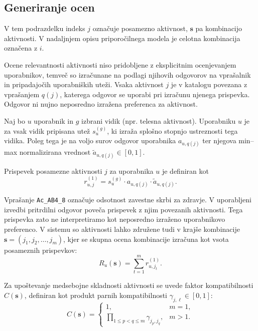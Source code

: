 \documentclass[a4paper,twoside,openright,12pt,slovene]{book}
\begin{document}
\subsection{Generiranje ocen}
\label{sec:data_rating_gen}

V tem podrazdelku indeks $j$ označuje posamezno aktivnost,
$\mathbf{s}$ pa kombinacijo aktivnosti. V nadaljnjem opisu
priporočilnega modela je celotna kombinacija označena z $i$.

Ocene relevantnosti aktivnosti niso pridobljene z eksplicitnim ocenjevanjem
uporabnikov, temveč so izračunane na podlagi njihovih odgovorov na vprašalnik
in pripadajočih uporabniških uteži. Vsaka aktivnost $j$ je v katalogu povezana z vprašanjem
$q(j)$, katerega odgovor se uporabi pri izračunu njenega
prispevka. Odgovor ni nujno neposredno izražena
preferenca za aktivnost.

Naj bo $u$ uporabnik in $g$ izbrani vidik (npr. telesna aktivnost). Uporabniku
$u$ je za vsak vidik pripisana utež $s_u^{(g)}$, ki izraža splošno stopnjo
ustreznosti tega vidika. Poleg tega je na voljo surov odgovor uporabnika
$a_{u,q(j)}$ ter njegova min--max normalizirana vrednost $\tilde{a}_{u,q(j)} \in
[0,1]$.

Prispevek posamezne aktivnosti $j$ za uporabnika $u$ je definiran kot
\begin{equation}
r_{u,j}^{(1)} =
s_u^{(g)} \cdot a_{u,q(j)} \cdot \tilde{a}_{u,q(j)} .
\end{equation}

Vprašanje \texttt{Ac\_AB4\_8} označuje odsotnost
zavestne skrbi za zdravje. V uporabljeni izvedbi
pritrdilni odgovor poveča prispevek z njim povezanih
aktivnosti. Tega prispevka zato ne interpretiramo
kot neposredno izraženo uporabnikovo preferenco.
V sistemu so aktivnosti lahko združene tudi v krajše kombinacije
$\mathbf{s} = (j_1, j_2, \dots, j_m)$, kjer se skupna ocena kombinacije izračuna kot
vsota posameznih prispevkov:
\begin{equation}
R_u(\mathbf{s}) = \sum_{t=1}^{m} r_{u,j_t}^{(1)} .
\end{equation}

Za upoštevanje medsebojne skladnosti aktivnosti se uvede faktor kompatibilnosti
$C(\mathbf{s})$, definiran kot produkt parnih kompatibilnosti $\gamma_{j,\ell} \in
[0,1]$:
\begin{equation}
C(\mathbf{s}) =
\begin{cases}
1, & m = 1, \\
\prod_{1 \le p < q \le m} \gamma_{j_p,j_q}, & m > 1 .
\end{cases}
\end{equation}
\end{document}
